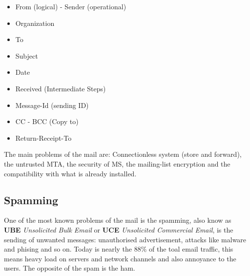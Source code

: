 \documentclass[12pt]{article}
\begin{document}
\begin{itemize}
  \item From (logical) - Sender (operational)
  \item Organization
  \item To
  \item Subject
  \item Date
  \item Received (Intermediate Steps)
  \item Message-Id (sending ID)
  \item CC - BCC (Copy to)
  \item Return-Receipt-To
\end{itemize}
The main problems of the mail are: Connectionless system (store and forward), the untrusted MTA, the security of MS, the mailing-list encryption and the compatibility with what is already installed.\\

\subsection{Spamming}
One of the most known problems of the mail is the spamming, also know as \textbf{UBE} \textit{Unsolicited Bulk Email} or \textbf{UCE} \textit{Unsolicited Commercial Email}, is the sending of unwanted messages: unauthorised advertisement, attacks like malware and phising and so on. Today is nearly the 88\% of the toal email traffic, this means heavy load on servers and network channels and also annoyance to the users. The opposite of the spam is the ham.\\
\end{document}
